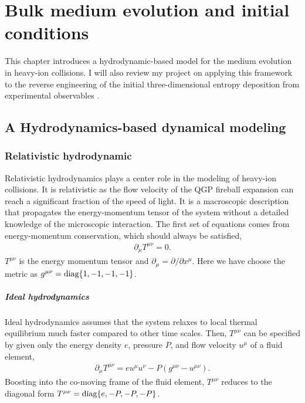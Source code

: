 \chapter{Bulk medium evolution and initial conditions}
\label{chapter:simulation}
This chapter introduces a hydrodynamic-based model for the medium evolution in heavy-ion collisions.
I will also review my project on applying this framework to the reverse engineering of the initial three-dimensional entropy deposition from experimental observables \cite{PhysRevC.96.044912}.

\section{A Hydrodynamics-based dynamical modeling}
\subsection{Relativistic hydrodynamic}
Relativistic hydrodynamics plays a center role in the modeling of heavy-ion collisions.
It is relativistic as the flow velocity of the QGP fireball expansion can reach a significant fraction of the speed of light.
It is a macroscopic description that propagates the energy-momentum tensor of the system without a detailed knowledge of the microscopic interaction.
The first set of equations comes from energy-momentum conservation, which should always be satisfied,
\begin{eqnarray}\label{eq:hydro:0-4}
\partial_\mu T^{\mu\nu} = 0.
\end{eqnarray}
$T^{\mu\nu}$ is the energy momentum tensor and $\partial_\mu = \partial/\partial x^\mu$. 
Here we have choose the metric as $g^{\mu\nu} = \operatorname{diag}\{1, -1, -1, -1\}$.

\paragraph{Ideal hydrodynamics} Ideal hydrodynamics assumes that the system relaxes to local thermal equilibrium much faster compared to other time scales. Then, $T^{\mu\nu}$ can be specified by given only the energy density $e$, pressure $P$, and flow velocity $u^\mu$ of a fluid element,
\begin{eqnarray}
\partial_\mu T^{\mu\nu} = e u^\mu u^\nu - P (g^{\mu\nu}-u^{\mu\nu}).
\end{eqnarray}
Boosting into the co-moving frame of the fluid element, $T^{\mu\nu}$ reduces to the diagonal form $T^{\mu\nu} = \operatorname{diag}\{e, -P, -P, -P\}$.


